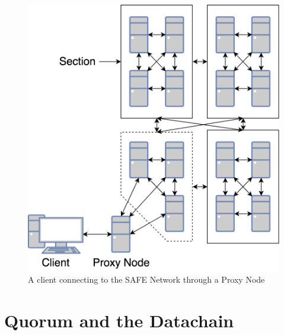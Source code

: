 \begin{figure}
	\begin{center}
		\includegraphics[width=\textwidth]{diagrams/safe-network-connection}
		\caption{A client connecting to the SAFE Network through a Proxy Node}
		\label{fig:proxy-connection}
	\end{center}
\end{figure}

\section{Quorum and the Datachain}

